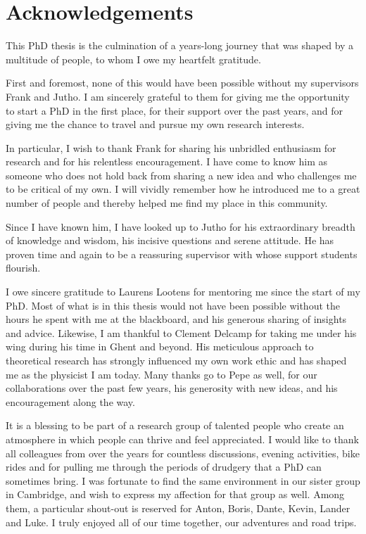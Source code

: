 \chapter*{Acknowledgements}
This PhD thesis is the culmination of a years-long journey that was shaped by a multitude of people, to whom I owe my heartfelt gratitude.

\bigskip\noindent First and foremost, none of this would have been possible without my supervisors Frank and Jutho. I am sincerely grateful to them for giving me the opportunity to start a PhD in the first place, for their support over the past years, and for giving me the chance to travel and pursue my own research interests.

In particular, I wish to thank Frank for sharing his unbridled enthusiasm for research and for his relentless encouragement. I have come to know him as someone who does not hold back from sharing a new idea and who challenges me to be critical of my own. I will vividly remember how he introduced me to a great number of people and thereby helped me find my place in this community.

Since I have known him, I have looked up to Jutho for his extraordinary breadth of knowledge and wisdom, his incisive questions and serene attitude. He has proven time and again to be a reassuring supervisor with whose support students flourish.

I owe sincere gratitude to Laurens Lootens for mentoring me since the start of my PhD. Most of what is in this thesis would not have been possible without the hours he spent with me at the blackboard, and his generous sharing of insights and advice. Likewise, I am thankful to Clement Delcamp for taking me under his wing during his time in Ghent and beyond. His meticulous approach to theoretical research has strongly influenced my own work ethic and has shaped me as the physicist I am today. Many thanks go to Pepe as well, for our collaborations over the past few years, his generosity with new ideas, and his encouragement along the way.

It is a blessing to be part of a research group of talented people who create an atmosphere in which people can thrive and feel appreciated. I would like to thank all colleagues from over the years for countless discussions, evening activities, bike rides and for pulling me through the periods of drudgery that a PhD can sometimes bring. I was fortunate to find the same environment in our sister group in Cambridge, and wish to express my affection for that group as well. Among them, a particular shout-out is reserved for Anton, Boris, Dante, Kevin, Lander and Luke. I truly enjoyed all of our time together, our adventures and road trips.

